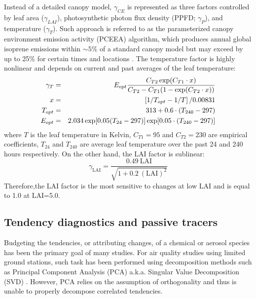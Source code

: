 	Instead of a detailed canopy model, $\gamma_{CE}$ is represented as three factors controlled by leaf area ($\gamma_{LAI}$), photosynthetic photon flux density (PPFD; $\gamma_P$), and temperature ($\gamma_T$). Such approach is referred to as the parameterized canopy environment emission activity (PCEEA) algorithm, which produces annual global isoprene emissions within $\sim 5\%$ of a standard canopy model but may exceed by up to 25\% for certain times and locations \citep{Guenther:2006kl}. The temperature factor is highly nonlinear and depends on current and past averages of the leaf temperature:
	\begin{eqnarray}
		\gamma_T &=& E_{opt}\frac{C_{T2}\exp(C_{T1}\cdot x)}{C_{T2}-C_{T1}(1-\exp(C_{T2}\cdot x))} \label{eqn:MEGAN-gammaT}  \\
		x &=& \left[1/T_{opt}-1/T\right]\large/0.00831 \\
		T_{opt} &=& 313 + 0.6 \cdot (T_{240}-297) \\
		E_{opt} &=& 2.034 \exp[0.05(T_{24}-297)]\exp[0.05\cdot(T_{240}-297)]
	\end{eqnarray}
	where $T$ is the leaf temperature in Kelvin, $C_{T1}=95$ and $C_{T2}=230$ are empirical coefficients, $T_{24}$ and $T_{240}$ are average leaf temperature over the past 24 and 240 hours respectively. On the other hand, the LAI factor is sublinear:
	\begin{equation}\label{eqn:MEGAN-gammaLAI}
		\gamma_{\mathrm{LAI}} = \frac{0.49~\mathrm{LAI}}{\sqrt{1 + 0.2~(\mathrm{LAI})^2}}
	\end{equation}
	Therefore,the LAI factor is the most sensitive to changes at low LAI  and is equal to 1.0 at LAI=5.0.

\subsection{Tendency diagnostics and passive tracers}\label{ssec:2006/method/diagnostics}

	Budgeting the tendencies, or attributing changes, of a chemical or aerosol species has been the primary goal of many studies. For air quality studies using limited ground stations, such task has been performed using decomposition methods such as Principal Component Analysis (PCA) a.k.a. Singular Value Decomposition (SVD) \citep[][and references therein]{Langford:2009mb}. However, PCA relies on the assumption of orthogonality and thus is unable to properly decompose correlated tendencies.
	

